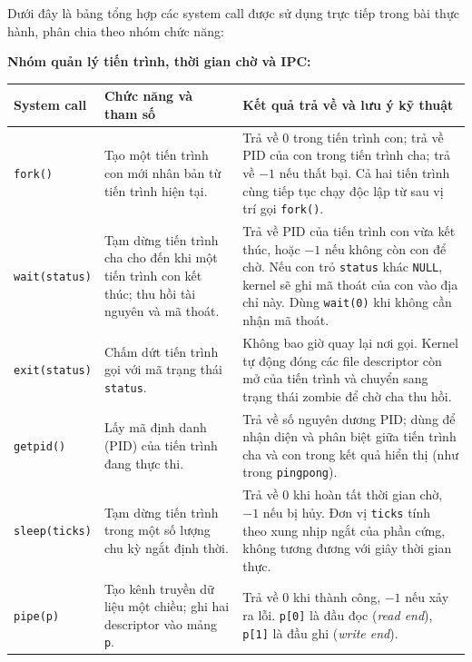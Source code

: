 \documentclass[12pt,a4paper]{article}
\begin{document}
Dưới đây là bảng tổng hợp các system call được sử dụng trực tiếp trong bài thực hành, phân chia theo nhóm chức năng:

\begin{minipage}{\textwidth}
\small
\renewcommand{\arraystretch}{1.2}
\setlength{\parskip}{0pt}
\textbf{Nhóm quản lý tiến trình, thời gian chờ và IPC:}\par\medskip
\begin{tabularx}{\textwidth}{@{}>{\raggedright\arraybackslash}p{}
  >{\raggedright\arraybackslash}p{}
  >{\raggedright\arraybackslash}X@{}}
\toprule
\rowcolor{tableheader}
\textbf{System call} & \textbf{Chức năng và tham số} & \textbf{Kết quả trả về và lưu ý kỹ thuật} \\
\midrule
\texttt{fork()} &
Tạo một tiến trình con mới nhân bản từ tiến trình hiện tại. &
Trả về $0$ trong tiến trình con; trả về PID của con trong tiến trình cha; trả về $-1$ nếu thất bại. Cả hai tiến trình cùng tiếp tục chạy độc lập từ sau vị trí gọi \texttt{fork()}. \\
\texttt{wait(status)} &
Tạm dừng tiến trình cha cho đến khi một tiến trình con kết thúc; thu hồi tài nguyên và mã thoát. &
Trả về PID của tiến trình con vừa kết thúc, hoặc $-1$ nếu không còn con để chờ. Nếu con trỏ \texttt{status} khác \texttt{NULL}, kernel sẽ ghi mã thoát của con vào địa chỉ này. Dùng \texttt{wait(0)} khi không cần nhận mã thoát. \\
\texttt{exit(status)} &
Chấm dứt tiến trình gọi với mã trạng thái \texttt{status}. &
Không bao giờ quay lại nơi gọi. Kernel tự động đóng các file descriptor còn mở của tiến trình và chuyển sang trạng thái zombie để chờ cha thu hồi. \\
\texttt{getpid()} &
Lấy mã định danh (PID) của tiến trình đang thực thi. &
Trả về số nguyên dương PID; dùng để nhận diện và phân biệt giữa tiến trình cha và con trong kết quả hiển thị (như trong \texttt{pingpong}). \\
\texttt{sleep(ticks)} &
Tạm dừng tiến trình trong một số lượng chu kỳ ngắt định thời. &
Trả về $0$ khi hoàn tất thời gian chờ, $-1$ nếu bị hủy. Đơn vị \texttt{ticks} tính theo xung nhịp ngắt của phần cứng, không tương đương với giây thời gian thực. \\
\texttt{pipe(p)} &
Tạo kênh truyền dữ liệu một chiều; ghi hai descriptor vào mảng \texttt{p}. &
Trả về $0$ khi thành công, $-1$ nếu xảy ra lỗi. \texttt{p[0]} là đầu đọc (\textit{read end}), \texttt{p[1]} là đầu ghi (\textit{write end}). \\
\bottomrule
\end{tabularx}
\end{minipage}
\end{document}
